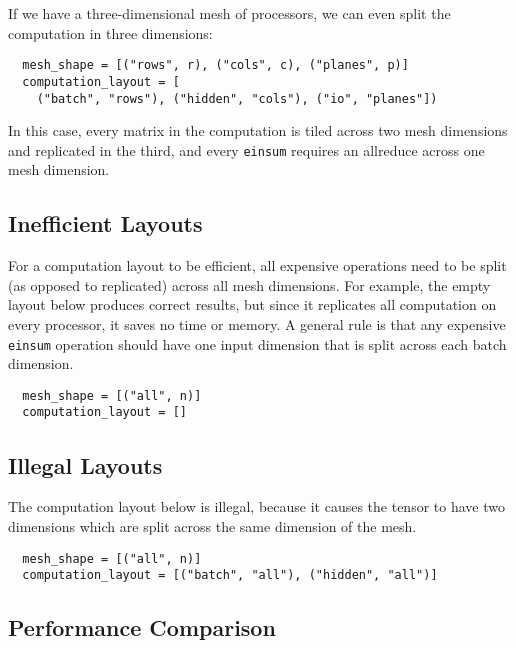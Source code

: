 \documentclass{article}
\begin{document}
If we have a three-dimensional mesh of processors, we can even split the computation in three dimensions:
\begin{verbatim}
  mesh_shape = [("rows", r), ("cols", c), ("planes", p)]
  computation_layout = [
    ("batch", "rows"), ("hidden", "cols"), ("io", "planes"])
\end{verbatim}
In this case, every matrix in the computation is tiled across two mesh dimensions and replicated in the third, and every \texttt{einsum} requires an allreduce across one mesh dimension.

\subsection{Inefficient Layouts}
For a computation layout to be efficient, all expensive operations need to be split (as opposed to replicated) across all mesh dimensions.  For example, the empty layout below produces correct results, but since it replicates all computation on every processor, it saves no time or memory.  A general rule is that any expensive \texttt{einsum} operation should have one input dimension that is split across each batch dimension.
\begin{verbatim}
  mesh_shape = [("all", n)]
  computation_layout = []
\end{verbatim}

\subsection{Illegal Layouts}
The computation layout below is illegal, because it causes the tensor  to have two dimensions which are split across the same dimension of the mesh.
\begin{verbatim}
  mesh_shape = [("all", n)]
  computation_layout = [("batch", "all"), ("hidden", "all")]
\end{verbatim}

\subsection{Performance Comparison}


\def \DXY {d_{io}}
\def \COMP {b \DXY d_h}
\end{document}
